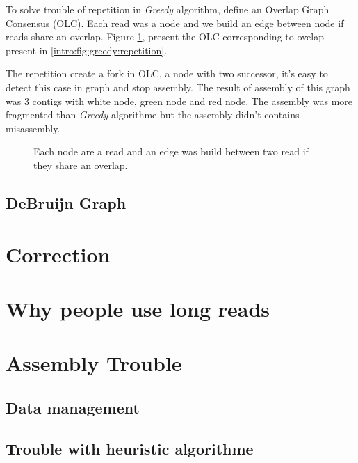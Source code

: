 \documentclass[main.tex]{subfiles}
\begin{document}
To solve trouble of repetition in \textit{Greedy} algorithm, %
define an Overlap Graph Consensus (OLC). Each read was a node and we build an edge between node if reads share an overlap. Figure \ref{intro:fig:olc:graph}, present the OLC corresponding to ovelap present in \ref{intro:fig:greedy:repetition}.

The repetition create a fork in OLC, a node with two successor, it's easy to detect this case in graph and stop assembly. The result of assembly of this graph was 3 contigs with white node, green node and red node. The assembly was more fragmented than \textit{Greedy} algorithme but the assembly didn't contains misassembly.

\begin{figure}
    \centering 
    
    \caption{Each node are a read and an edge was build between two read if they share an overlap.}
    \label{intro:fig:olc:graph}
\end{figure}

\subsection{DeBruijn Graph}





\section{Correction}

\section{Why people use long reads}

\section{Assembly Trouble}

\subsection{Data management}

\subsection{Trouble with heuristic algorithme}
\end{document}
